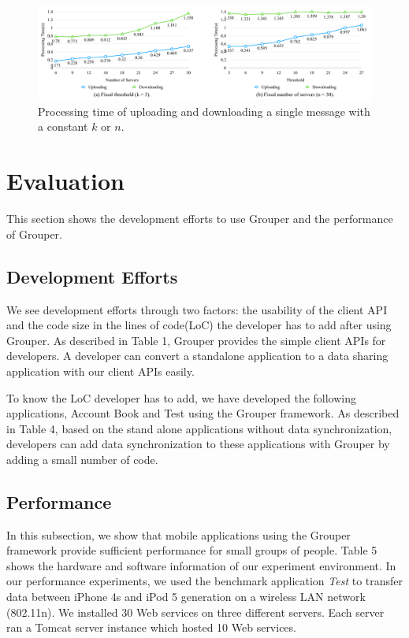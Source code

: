 \documentclass[twocolumn,10pt]{article}
\begin{document}
\begin{figure}[t]
	\centering
	\includegraphics[scale=0.13]{constant_k_n}
	\caption{Processing time of uploading and downloading a single message with a constant ${k}$ or ${n}$.}
\end{figure}

\section{Evaluation}

This section shows the development efforts to use Grouper and the performance of Grouper.

\subsection{Development Efforts}

We see development efforts through two factors: the usability of the client API and the code size in the lines of code(LoC) the developer has to add after using Grouper. 
As described in Table 1, Grouper provides the simple client APIs for developers.
A developer can convert a standalone application to a data sharing application with our client APIs easily.

To know the LoC developer has to add, we have developed the following applications, Account Book and Test using the Grouper framework.
As described in Table 4, based on the stand alone applications without data synchronization, developers can add data synchronization to these applications with Grouper by adding a small number of code. 

\subsection{Performance}

In this subsection, we show that mobile applications using the Grouper framework provide sufficient performance for small groups of people.
Table 5 shows the hardware and software information of our experiment environment.
In our performance experiments, we used the benchmark application \emph{Test} to transfer data between iPhone 4s and iPod 5 generation on a wireless LAN network (802.11n).
We installed 30 Web services on three different servers.
Each server ran a Tomcat server instance which hosted 10 Web services.
\end{document}
